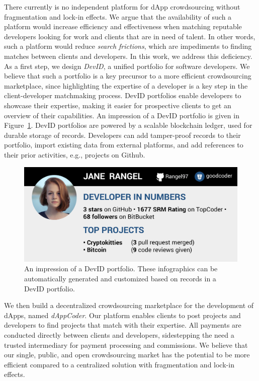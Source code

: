 There currently is no independent platform for dApp crowdsourcing without fragmentation and lock-in effects.
We argue that the availability of such a platform would increase efficiency and effectiveness when matching reputable developers looking for work and clients that are in need of talent.
In other words, such a platform would reduce \emph{search frictions}, which are impediments to finding matches between clients and developers.
In this work, we address this deficiency.
As a first step, we design \emph{DevID}, a unified portfolio for software developers.
We believe that such a portfolio is a key precursor to a more efficient crowdsourcing marketplace, since highlighting the expertise of a developer is a key step in the client-developer matchmaking process.
DevID portfolios enable developers to showcase their expertise, making it easier for prospective clients to get an overview of their capabilities.
An impression of a DevID portfolio is given in Figure~\ref{fig:devid}.
DevID portfolios are powered by a scalable blockchain ledger, used for durable storage of records.
Developers can add tamper-proof records to their portfolio, import existing data from external platforms, and add references to their prior activities, e.g., projects on Github.

\begin{figure}[t]
	\includegraphics[width=\columnwidth]{devid/resources/devid_smaller.jpeg}
	\caption{An impression of a DevID portfolio. These infographics can be automatically generated and customized based on records in a DevID portfolio.}
	\label{fig:devid}
\end{figure}

We then build a decentralized crowdsourcing marketplace for the development of dApps, named \emph{dAppCoder}.
Our platform enables clients to post projects and developers to find projects that match with their expertise.
All payments are conducted directly between clients and developers, sidestepping the need a trusted intermediary for payment processing and commissions.
We believe that our single, public, and open crowdsourcing market has the potential to be more efficient compared to a centralized solution with fragmentation and lock-in effects.

